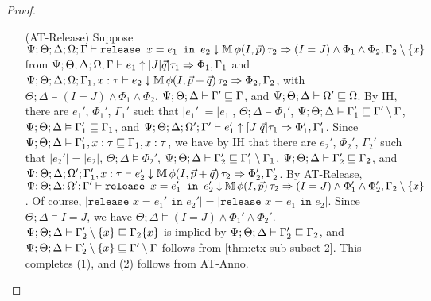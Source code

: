 \begin{proof}
\begin{itemize}
  \item[(AT-Release)] Suppose
  $\Psi ; \Theta ; \Delta ; \Omega ; \Gamma \vdash \texttt{release } x = e_1 \texttt{ in }e_2 \downarrow \mathbb{M} \, \phi(I,\vec{p}) \, \tau_2 \Rightarrow (I = J) \wedge \Phi_1 \wedge \Phi_2, \Gamma_2 \setminus \{x\}$ from
  $\Psi ; \Theta ; \Delta ; \Omega ; \Gamma \vdash e_1 \uparrow [J | \vec{q}] \tau_1 \Rightarrow \Phi_1,\Gamma_1$ and
  $\Psi ; \Theta ; \Delta ; \Omega ; \Gamma_1, x : \tau \vdash e_2 \downarrow \mathbb{M} \, \phi(I,\vec{p} + \vec{q}) \, \tau_2 \Rightarrow \Phi_2, \Gamma_2$, with
  $\Theta ; \Delta \vDash (I = J) \wedge \Phi_1 \wedge \Phi_2$,
  $\Psi ; \Theta ; \Delta \vdash \Gamma' \sqsubseteq \Gamma$, and
  $\Psi ; \Theta ; \Delta \vdash \Omega' \sqsubseteq \Omega$.
  By IH, there are $e_1'$, $\Phi_1'$, $\Gamma_1'$ such that
  $|e_1'| = |e_1|$,
  $\Theta ; \Delta \vDash \Phi_1'$,
  $\Psi ; \Theta ; \Delta \vDash \Gamma_1' \sqsubseteq \Gamma' \setminus \Gamma$,
  $\Psi ; \Theta ; \Delta \vDash \Gamma_1' \sqsubseteq \Gamma_1$, and
  $\Psi ; \Theta ; \Delta ; \Omega' ; \Gamma' \vdash e_1' \uparrow [J|\vec{q}] \tau_1 \Rightarrow \Phi_1',\Gamma_1'$.
  Since $\Psi ; \Theta ; \Delta \vDash \Gamma_1', x : \tau \sqsubseteq \Gamma_1, x : \tau$, we have
  by IH that there are $e_2'$, $\Phi_2'$, $\Gamma_2'$ such that
  $|e_2'| = |e_2|$,
  $\Theta ; \Delta \vDash \Phi_2'$,
  $\Psi ; \Theta ; \Delta \vdash \Gamma_2' \sqsubseteq \Gamma_1' \setminus \Gamma_1$,
  $\Psi ; \Theta ; \Delta \vdash \Gamma_2' \sqsubseteq \Gamma_2$, and
  $\Psi ; \Theta ; \Delta ; \Omega' ; \Gamma_1', x : \tau \vdash e_2' \downarrow \mathbb{M} \, \phi(I,\vec{p} + \vec{q}) \, \tau_2 \Rightarrow \Phi_2',\Gamma_2'$.
  By AT-Release,
  $\Psi ; \Theta ; \Delta ; \Omega' ; \Gamma' \vdash \texttt{release } x = e_1' \texttt{ in }e_2' \downarrow \mathbb{M} \, \phi(I,\vec{p}) \, \tau_2 \Rightarrow (I = J) \wedge \Phi_1' \wedge \Phi_2', \Gamma_2 \setminus \{x\}$.
  Of course, $|\texttt{release } x = e_1' \texttt{ in }e_2'| = |\texttt{release } x = e_1 \texttt{ in }e_2|$.
  Since $\Theta ; \Delta \vDash I = J$, we have $\Theta ; \Delta \vDash (I = J) \wedge \Phi_1' \wedge \Phi_2'$.
  $\Psi ; \Theta ; \Delta \vdash \Gamma_2' \setminus \{x\} \sqsubseteq \Gamma_2 \{x\}$ is implied by $\Psi ; \Theta ; \Delta \vdash \Gamma_2' \sqsubseteq \Gamma_2$,
  and $\Psi ; \Theta ; \Delta \vdash \Gamma_2' \setminus \{x\} \sqsubseteq \Gamma' \setminus \Gamma$ follows from \autoref{thm:ctx-sub-subset-2}. This completes (1), and (2) follows from AT-Anno.
  

\end{itemize}
\end{proof}
